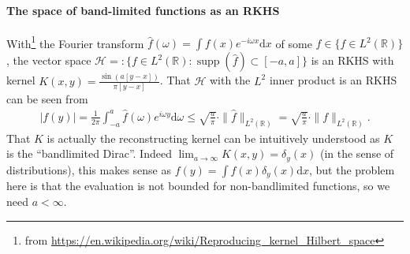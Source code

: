 \documentclass{scrartcl}
\theoremstyle{definition}
\theoremstyle{remark}
\newcommand{\de}{\mathrm d}
\newcommand{\R}{\mathbb R}
\begin{document}
{\paragraph{The space of band-limited functions as an RKHS}
With\footnote{from \url{https://en.wikipedia.org/wiki/Reproducing_kernel_Hilbert_space}} the Fourier transform $\hat f(\omega) = \int f(x) e^{-i\omega x}\de x$ of some $f\in \{f\in L^2(\R)\}$, the vector space $\mathcal H = : \{f\in L^2(\R):\operatorname{supp}(\hat f)\subset [-a,a]\}$ is an RKHS with kernel $K(x,y) = \frac{\sin(a[y-x])}{\pi[y-x]}$. That $\mathcal H$ with the $L^2$ inner product is an RKHS can be seen from 
\begin{align*}
|f(y)| = \frac{1}{2\pi} \int_{-a}^a \hat f(\omega) e^{i\omega y} \de \omega \leq \sqrt{\frac{a}{\pi}}\cdot \|\hat f\|_{L^2(\R)} = \sqrt{\frac{a}{\pi}}\cdot \|f\|_{L^2(\R)}.
\end{align*}
That $K$ is actually the reconstructing kernel can be intuitively understood as $K$ is the ``bandlimited Dirac''. Indeed $\lim_{a\to\infty} K(x,y) = \delta_y(x)$ (in the sense of distributions), this makes sense as $f(y) = \int f(x) \delta_y(x)\de x$, but the problem here is that the evaluation is not bounded for non-bandlimited functions, so we need $a<\infty$. 

}
\end{document}
